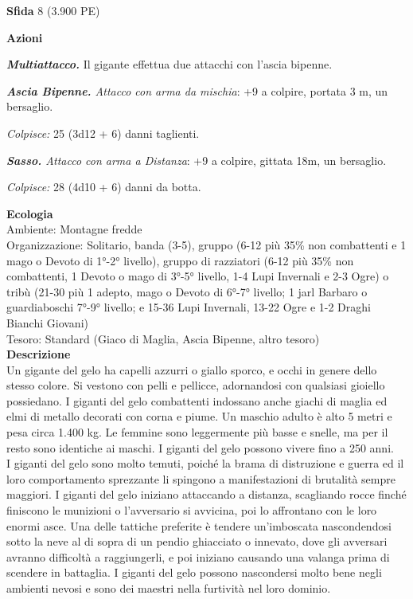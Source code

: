 \begin{multicols}{2}
\textbf{Sfida} 8 (3.900 PE)

\textbf{Azioni}

\emph{\textbf{Multiattacco.}} Il gigante effettua due attacchi con l'ascia bipenne.

\emph{\textbf{Ascia Bipenne.} Attacco con arma da mischia}: +9 a colpire, portata 3 m, un bersaglio.

\emph{Colpisce:} 25 (3d12 + 6) danni taglienti.

\emph{\textbf{Sasso.} Attacco con arma a Distanza}: +9 a colpire, gittata 18m, un bersaglio.

\emph{Colpisce:} 28 (4d10 + 6) danni da botta.

\textbf{Ecologia}\\
Ambiente: Montagne fredde\\
Organizzazione: Solitario, banda (3-5), gruppo (6-12 più 35\% non combattenti e 1 mago o Devoto di 1°-2° livello), gruppo di razziatori (6-12 più 35\% non combattenti, 1 Devoto o mago di 3°-5° livello, 1-4 Lupi Invernali e 2-3 Ogre) o tribù (21-30 più 1 adepto, mago o Devoto di 6°-7° livello; 1 jarl Barbaro o guardiaboschi 7°-9° livello; e 15-36 Lupi Invernali, 13-22 Ogre e 1-2 Draghi Bianchi Giovani)\\
Tesoro: Standard (Giaco di Maglia, Ascia Bipenne, altro tesoro)\\
\textbf{Descrizione}\\
Un gigante del gelo ha capelli azzurri o giallo sporco, e occhi in genere dello stesso colore. Si vestono con pelli e pellicce, adornandosi con qualsiasi gioiello possiedano. I giganti del gelo combattenti indossano anche giachi di maglia ed elmi di metallo decorati con corna e piume. Un maschio adulto è alto 5 metri e pesa circa 1.400 kg. Le femmine sono leggermente più basse e snelle, ma per il resto sono identiche ai maschi. I giganti del gelo possono vivere fino a 250 anni.\\

I giganti del gelo sono molto temuti, poiché la brama di distruzione e guerra ed il loro comportamento sprezzante li spingono a manifestazioni di brutalità sempre maggiori. I giganti del gelo iniziano attaccando a distanza, scagliando rocce finché finiscono le munizioni o l'avversario si avvicina, poi lo affrontano con le loro enormi asce. Una delle tattiche preferite è tendere un'imboscata nascondendosi sotto la neve al di sopra di un pendio ghiacciato o innevato, dove gli avversari avranno difficoltà a raggiungerli, e poi iniziano causando una valanga prima di scendere in battaglia. I giganti del gelo possono nascondersi molto bene negli ambienti nevosi e sono dei maestri nella furtività nel loro dominio.\\


\end{multicols}
